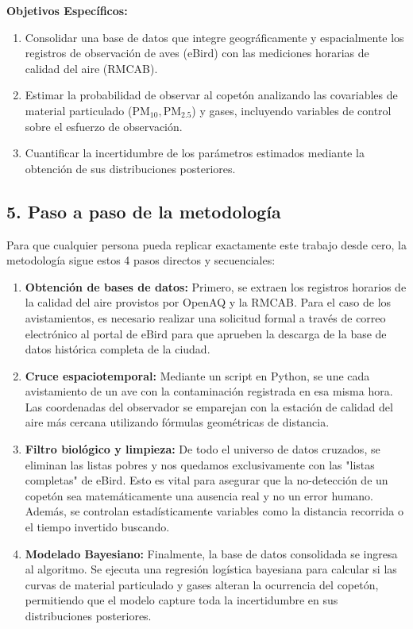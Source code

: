 \documentclass[12pt]{article}
\begin{document}
\textbf{Objetivos Específicos:}
\begin{enumerate}
    \item Consolidar una base de datos que integre geográficamente y espacialmente los registros de observación de aves (eBird) con las mediciones horarias de calidad del aire (RMCAB).
    \item Estimar la probabilidad de observar al copetón analizando las covariables de material particulado ($\text{PM}_{10}, \text{PM}_{2.5}$) y gases, incluyendo variables de control sobre el esfuerzo de observación.
    \item Cuantificar la incertidumbre de los parámetros estimados mediante la obtención de sus distribuciones posteriores.
\end{enumerate}

\subsection*{5. Paso a paso de la metodología}

Para que cualquier persona pueda replicar exactamente este trabajo desde cero, la metodología sigue estos 4 pasos directos y secuenciales:

\begin{enumerate}
    \item \textbf{Obtención de bases de datos:} Primero, se extraen los registros horarios de la calidad del aire provistos por OpenAQ y la RMCAB. Para el caso de los avistamientos, es necesario realizar una solicitud formal a través de correo electrónico al portal de eBird para que aprueben la descarga de la base de datos histórica completa de la ciudad.
    \item \textbf{Cruce espaciotemporal:} Mediante un script en Python, se une cada avistamiento de un ave con la contaminación registrada en esa misma hora. Las coordenadas del observador se emparejan con la estación de calidad del aire más cercana utilizando fórmulas geométricas de distancia.
    \item \textbf{Filtro biológico y limpieza:} De todo el universo de datos cruzados, se eliminan las listas pobres y nos quedamos exclusivamente con las "listas completas" de eBird. Esto es vital para asegurar que la no-detección de un copetón sea matemáticamente una ausencia real y no un error humano. Además, se controlan estadísticamente variables como la distancia recorrida o el tiempo invertido buscando.
    \item \textbf{Modelado Bayesiano:} Finalmente, la base de datos consolidada se ingresa al algoritmo. Se ejecuta una regresión logística bayesiana para calcular si las curvas de material particulado y gases alteran la ocurrencia del copetón, permitiendo que el modelo capture toda la incertidumbre en sus distribuciones posteriores.
\end{enumerate}
\end{document}
